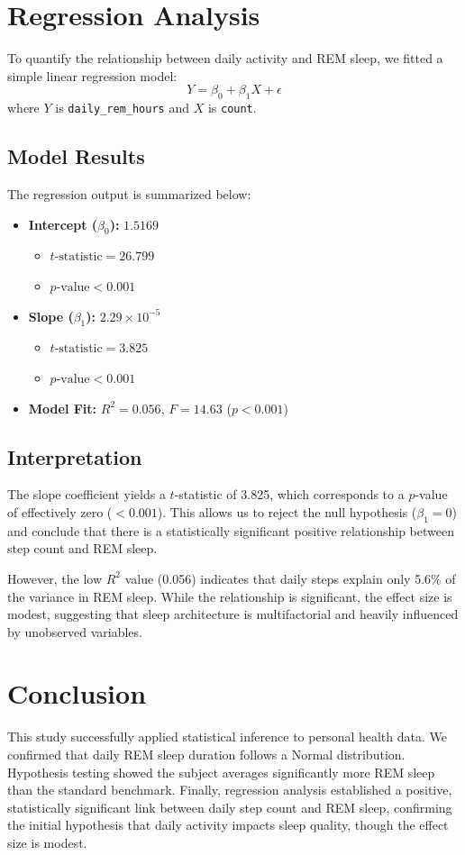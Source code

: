 \documentclass[conference]{IEEEtran}
\begin{document}
\section{Regression Analysis}
To quantify the relationship between daily activity and REM sleep, we fitted a simple linear regression model:
\[ Y = \beta_0 + \beta_1 X + \epsilon \]
where $Y$ is \texttt{daily\_rem\_hours} and $X$ is \texttt{count}.

\subsection{Model Results}
The regression output is summarized below:
\begin{itemize}
    \item \textbf{Intercept ($\beta_0$):} $1.5169$
    \begin{itemize}
        \item $t\text{-statistic} = 26.799$
        \item $p\text{-value} < 0.001$
    \end{itemize}
    \item \textbf{Slope ($\beta_1$):} $2.29 \times 10^{-5}$
    \begin{itemize}
        \item $t\text{-statistic} = 3.825$
        \item $p\text{-value} < 0.001$
    \end{itemize}
    \item \textbf{Model Fit:} $R^2 = 0.056$, $F = 14.63$ ($p < 0.001$)
\end{itemize}

\subsection{Interpretation}
The slope coefficient yields a $t$-statistic of 3.825, which corresponds to a $p$-value of effectively zero ($< 0.001$). This allows us to reject the null hypothesis ($\beta_1 = 0$) and conclude that there is a statistically significant positive relationship between step count and REM sleep.

However, the low $R^2$ value (0.056) indicates that daily steps explain only 5.6\% of the variance in REM sleep. While the relationship is significant, the effect size is modest, suggesting that sleep architecture is multifactorial and heavily influenced by unobserved variables.

\section{Conclusion}
This study successfully applied statistical inference to personal health data. We confirmed that daily REM sleep duration follows a Normal distribution. Hypothesis testing showed the subject averages significantly more REM sleep than the standard benchmark. Finally, regression analysis established a positive, statistically significant link between daily step count and REM sleep, confirming the initial hypothesis that daily activity impacts sleep quality, though the effect size is modest.
\end{document}
